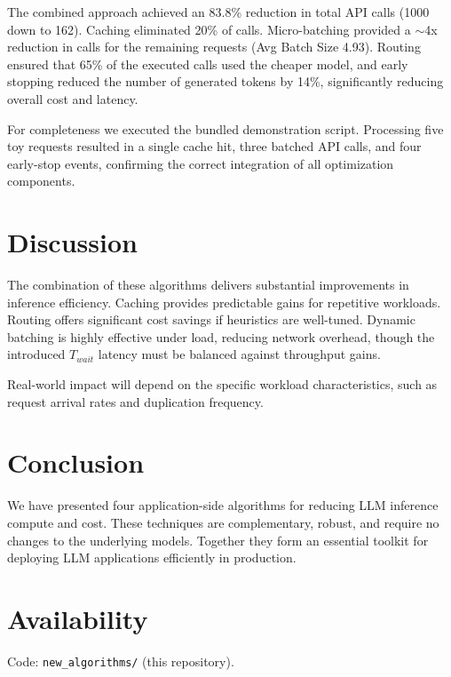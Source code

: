 \documentclass[11pt]{article}
\begin{document}
The combined approach achieved an 83.8\% reduction in total API calls (1000 down to 162). Caching eliminated 20\% of calls. Micro-batching provided a $\sim$4x reduction in calls for the remaining requests (Avg Batch Size 4.93). Routing ensured that 65\% of the executed calls used the cheaper model, and early stopping reduced the number of generated tokens by 14\%, significantly reducing overall cost and latency.

For completeness we executed the bundled demonstration script. Processing five toy requests resulted in a single cache hit, three batched API calls, and four early-stop events, confirming the correct integration of all optimization components.

\section{Discussion}
The combination of these algorithms delivers substantial improvements in inference efficiency. Caching provides predictable gains for repetitive workloads. Routing offers significant cost savings if heuristics are well-tuned. Dynamic batching is highly effective under load, reducing network overhead, though the introduced $T_{wait}$ latency must be balanced against throughput gains.

Real-world impact will depend on the specific workload characteristics, such as request arrival rates and duplication frequency.

\section{Conclusion}
We have presented four application-side algorithms for reducing LLM inference compute and cost. These techniques are complementary, robust, and require no changes to the underlying models. Together they form an essential toolkit for deploying LLM applications efficiently in production.

\section*{Availability}
Code: \texttt{new\_algorithms/} (this repository).



\end{document}
